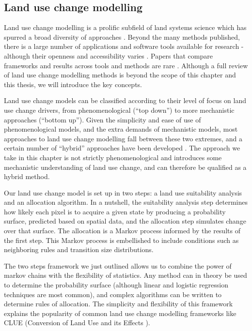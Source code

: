 \subsection{Land use change modelling}
Land use change modelling is a prolific subfield of land systems science which has spurred a broad diversity of approaches \citep{dang_review_2016, noszczyk_review_2018}. Beyond the many methods published, there is a large number of applications and software tools available for research - although their openness and accessibility varies \citep{moulds_open_2015}. Papers that compare frameworks and results across tools and methods are rare \citep{pontius_comparing_2008, pontius_comparison_2005, sun_comparison_2018}. Although a full review of land use change modelling methods is beyond the scope of this chapter and this thesis, we will introduce the key concepts.

Land use change models can be classified according to their level of focus on land use change drivers, from phenomenological (“top down”) to more mechanistic approaches (“bottom up”). Given the simplicity and ease of use of phenomenological models, and the extra demands of mechanistic models, most approaches to land use change modelling fall between these two extremes, and a certain number of “hybrid” approaches have been developed \citep{sun_comparison_2018, jokar_arsanjani_integration_2013}. The approach we take in this chapter is not strictly phenomenological and introduces some mechanistic understanding of land use change, and can therefore be qualified as a hybrid method.

Our land use change model is set up in two steps: a land use suitability analysis and an allocation algorithm. In a nutshell, the suitability analysis step determines how likely each pixel is to acquire a given state by producing a probability surface, predicted based on spatial data, and the allocation step simulates change over that surface. The allocation is a Markov process informed by the results of the first step. This Markov process is embellished to include conditions such as neighboring rules and transition size distributions.

The two steps framework we just outlined allows us to combine the power of markov chains with the flexibility of statistics. Any method can in theory be used to determine the probability surface (although linear and logistic regression techniques are most common), and complex algorithms can be written to determine rules of allocation. The simplicity and flexibility of this framework explains the popularity of common land use change modelling frameworks like CLUE  (Conversion of Land Use and its Effects \cite{verburg_modeling_2002, verburg_combining_2009}). \\

